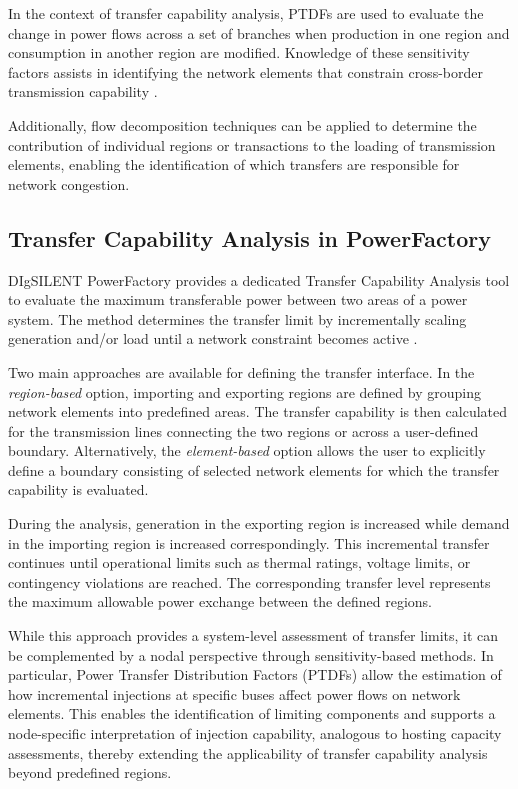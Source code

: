 In the context of transfer capability analysis, PTDFs are used to evaluate the change in power flows across a set of branches when production in one region and consumption in another region are modified. Knowledge of these sensitivity factors assists in identifying the network elements that constrain cross-border transmission capability \cite{digsilent2024pfmanual}.

Additionally, flow decomposition techniques can be applied to determine the contribution of individual regions or transactions to the loading of transmission elements, enabling the identification of which transfers are responsible for network congestion.

\subsection{Transfer Capability Analysis in PowerFactory}

DIgSILENT PowerFactory provides a dedicated Transfer Capability Analysis tool to evaluate the maximum transferable power between two areas of a power system. The method determines the transfer limit by incrementally scaling generation and/or load until a network constraint becomes active \cite{digsilent2024pfmanual}.

Two main approaches are available for defining the transfer interface. In the \textit{region-based} option, importing and exporting regions are defined by grouping network elements into predefined areas. The transfer capability is then calculated for the transmission lines connecting the two regions or across a user-defined boundary. Alternatively, the \textit{element-based} option allows the user to explicitly define a boundary consisting of selected network elements for which the transfer capability is evaluated.

During the analysis, generation in the exporting region is increased while demand in the importing region is increased correspondingly. This incremental transfer continues until operational limits such as thermal ratings, voltage limits, or contingency violations are reached. The corresponding transfer level represents the maximum allowable power exchange between the defined regions.

While this approach provides a system-level assessment of transfer limits, it can be complemented by a nodal perspective through sensitivity-based methods. In particular, Power Transfer Distribution Factors (PTDFs) allow the estimation of how incremental injections at specific buses affect power flows on network elements. This enables the identification of limiting components and supports a node-specific interpretation of injection capability, analogous to hosting capacity assessments, thereby extending the applicability of transfer capability analysis beyond predefined regions.